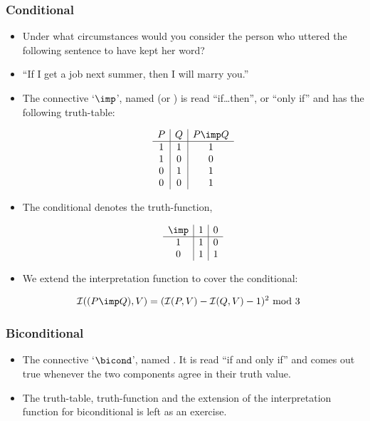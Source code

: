 \documentclass[11pt]{article}
\begin{document}
\subsubsection{Conditional}
\begin{itemize}
\item Under what circumstances would you consider the person who uttered the
following sentence to have kept her word?

\item[] ``If I get a job next summer, then I will marry you.''


\item The connective `$\imp$', named  (or
) is read ``if\ldots then'', or ``only
if'' and  has the following truth-table: 

$$
\begin{array}{c|c|c}
P & Q & P\imp Q \\ \hline
1 & 1 & 1\\
1 & 0 & 0\\
0 & 1 & 1\\
0 & 0 & 1
\end{array}
$$

\item The conditional denotes the truth-function,

\begin{align}
\begin{array}{c|c|c}
\imp & 1 & 0 \\ \hline
1 & 1 & 0 \\
0 & 1 & 1 
\end{array}
\end{align}

\item We extend the interpretation function to cover the conditional:

\begin{align}
\mathcal{I}((P\imp Q),V) & = (\mathcal{I}(P,V) - \mathcal{I}(Q,V) -1)^2 \text{
mod } 3
\end{align}

\end{itemize}

\subsubsection{Biconditional}

\begin{itemize}

\item The connective `$\bicond$', named . It is read ``if
and only if'' and comes out true whenever the two components agree in their
truth value.

\item The truth-table, truth-function and the extension of the interpretation function for
biconditional is left as an exercise.

\end{itemize}
\end{document}
